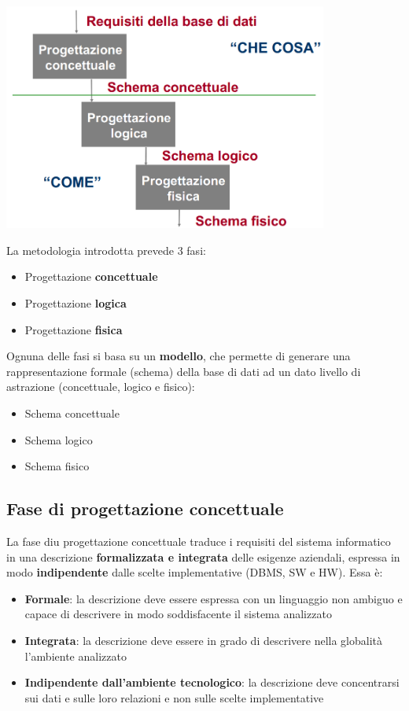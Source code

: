 \documentclass[12pt]{article}
\begin{document}
\begin{center}
    \includegraphics[width = 0.80\textwidth]{Images/13.PNG}
\end{center}
La metodologia introdotta prevede 3 fasi:
\begin{itemize}
    \item Progettazione \textbf{concettuale}
    \item Progettazione \textbf{logica}
    \item Progettazione \textbf{fisica}
\end{itemize}
Ognuna delle fasi si basa su un \textbf{modello}, che permette di generare una rappresentazione formale (schema) della base di dati ad un dato livello di astrazione (concettuale, logico e fisico):
\begin{itemize}
    \item Schema concettuale
    \item Schema logico
    \item Schema fisico
\end{itemize}
\subsection{Fase di progettazione concettuale}
La fase diu progettazione concettuale traduce i requisiti del sistema informatico in una descrizione \textbf{formalizzata e integrata} delle esigenze aziendali, espressa in modo \textbf{indipendente} dalle scelte implementative (DBMS, SW e HW).
Essa è:
\begin{itemize}
    \item \textbf{Formale}: la descrizione deve essere espressa con un linguaggio non ambiguo e capace di descrivere in modo soddisfacente il sistema analizzato
    \item \textbf{Integrata}: la descrizione deve essere in grado di descrivere nella globalità l'ambiente analizzato
    \item \textbf{Indipendente dall'ambiente tecnologico}: la descrizione deve concentrarsi sui dati e sulle loro relazioni e non sulle scelte implementative
\end{itemize}
\end{document}

